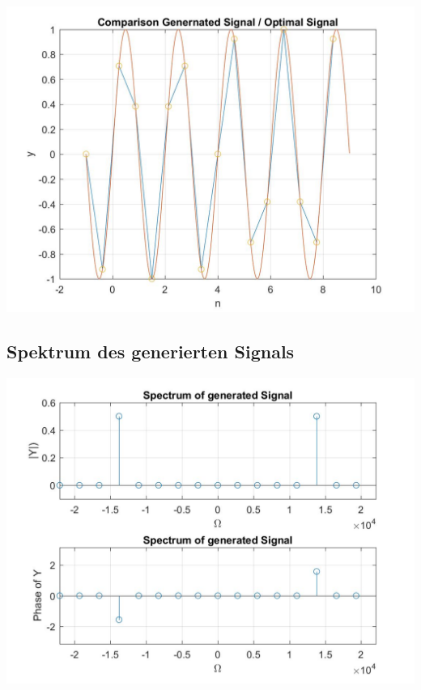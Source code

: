 \begin{center}
\includegraphics[scale=0.35]{../fig4_2_1_comparison.jpg}
\end{center}

\subsection{Spektrum des generierten Signals}

\begin{center}
\includegraphics[scale=0.35]{../fig4_2_2_spectrum.jpg}
\end{center}

\newpage

